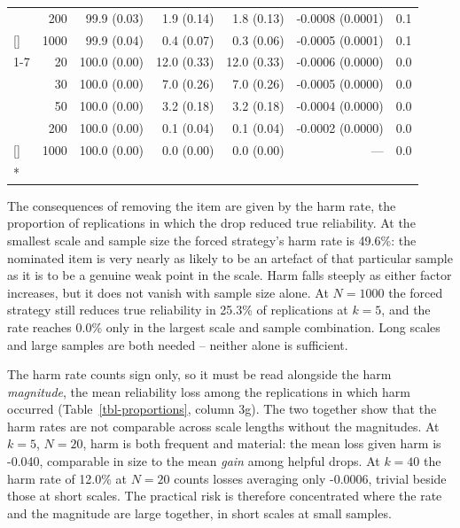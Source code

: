 \documentclass[
  nonatbib,
  authoryear,
  preprint]{elsarticle}
\begin{document}
\begin{longtable}[t]{lrrrrrr}
 & 200 & 99.9 (0.03) & 1.9 (0.14) & 1.8 (0.13) & -0.0008 (0.0001) & 0.1\\
\nopagebreak
\multirow[t]{-4}{*}[\normalbaselineskip]{\raggedright\arraybackslash 20} & 1000 & 99.9 (0.04) & 0.4 (0.07) & 0.3 (0.06) & -0.0005 (0.0001) & 0.1\\
\cmidrule{1-7}\pagebreak[0]
 & 20 & 100.0 (0.00) & 12.0 (0.33) & 12.0 (0.33) & -0.0006 (0.0000) & 0.0\\
\nopagebreak
 & 30 & 100.0 (0.00) & 7.0 (0.26) & 7.0 (0.26) & -0.0005 (0.0000) & 0.0\\
\nopagebreak
 & 50 & 100.0 (0.00) & 3.2 (0.18) & 3.2 (0.18) & -0.0004 (0.0000) & 0.0\\
\nopagebreak
 & 200 & 100.0 (0.00) & 0.1 (0.04) & 0.1 (0.04) & -0.0002 (0.0000) & 0.0\\
\nopagebreak
\multirow[t]{-4}{*}[\normalbaselineskip]{\raggedright\arraybackslash 40} & 1000 & 100.0 (0.00) & 0.0 (0.00) & 0.0 (0.00) & --- & 0.0\\*

\end{longtable}

\endgroup{}

The consequences of removing the item are given by the harm rate, the
proportion of replications in which the drop reduced true reliability.
At the smallest scale and sample size the forced strategy's harm rate is
49.6\%: the nominated item is very nearly as likely to be an artefact of
that particular sample as it is to be a genuine weak point in the scale.
Harm falls steeply as either factor increases, but it does not vanish
with sample size alone. At \(N = 1000\) the forced strategy still
reduces true reliability in 25.3\% of replications at \(k = 5\), and the
rate reaches 0.0\% only in the largest scale and sample combination.
Long scales and large samples are both needed -- neither alone is
sufficient.

The harm rate counts sign only, so it must be read alongside the harm
\emph{magnitude}, the mean reliability loss among the replications in
which harm occurred (Table~\ref{tbl-proportions}, column 3g). The two
together show that the harm rates are not comparable across scale
lengths without the magnitudes. At \(k = 5\), \(N = 20\), harm is both
frequent and material: the mean loss given harm is -0.040, comparable in
size to the mean \emph{gain} among helpful drops. At \(k = 40\) the harm
rate of 12.0\% at \(N = 20\) counts losses averaging only -0.0006,
trivial beside those at short scales. The practical risk is therefore
concentrated where the rate and the magnitude are large together, in
short scales at small samples.
\end{document}
